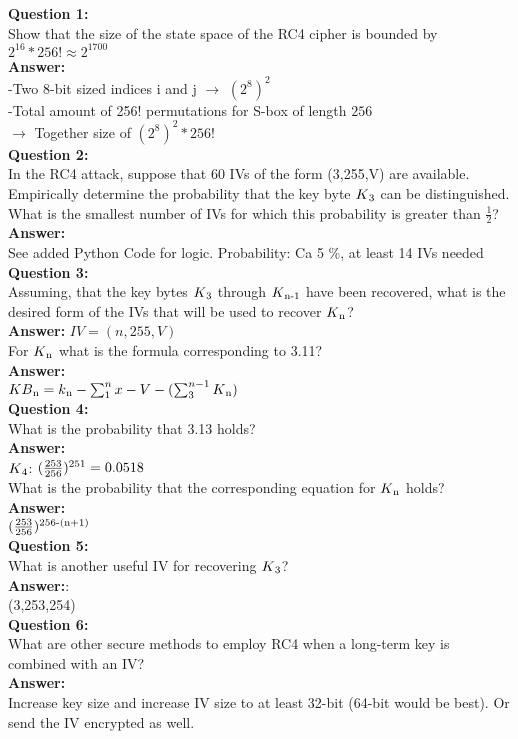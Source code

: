 \documentclass[5pt,a4paper]{article}
\begin{document}
\textbf{Question 1:}\\
Show that the size of the state space of the RC4 cipher is bounded by $2^{16} * 256! \approx 2^{1700}$\\
\textbf{Answer:} \\
-Two 8-bit sized indices i and j $\rightarrow$ $(2^{8})^{2}$\\
-Total amount of 256! permutations for S-box of length $256$\\
$\rightarrow$ Together size of $(2^{8})^{2} * 256!$\\

\textbf{Question 2:}\\
In the RC4 attack, suppose that 60 IVs of the form (3,255,V) are available. Empirically determine the probability that the key byte $K\textsubscript{3}$ can be distinguished.\\
What is the smallest number of IVs for which this probability is greater than $\frac{1}{2}$?\\
\textbf{Answer:}\\
See added Python Code for logic. Probability: Ca 5 \%, at least 14 IVs needed\\

\textbf{Question 3:}\\
Assuming, that the key bytes $K\textsubscript{3}$ through $K\textsubscript{n-1}$ have been recovered, what is the desired form of the IVs that will be used to recover $K\textsubscript{n}$?\\
\textbf{Answer:} $IV = (n,255,V)$\\
For $K\textsubscript{n}$ what is the formula corresponding to 3.11?\\
\textbf{Answer:} \\
$KB\textsubscript{n} = k\textsubscript{n} - \sum_{1}^{n}x - V - (\sum_{3}^{n-1}K\textsubscript{n})$\\

\textbf{Question 4:}\\
What is the probability that 3.13 holds?\\
\textbf{Answer:}\\
$K\textsubscript{4}$: $(\frac{253}{256})\textsuperscript{251} = 0.0518$\\
What is the probability that the corresponding equation for $K\textsubscript{n}$ holds?\\
\textbf{Answer:}\\
$(\frac{253}{256})\textsuperscript{256-(n+1)}$\\

\textbf{Question 5:}\\
What is another useful IV for recovering $K\textsubscript{3}$?\\
\textbf{Answer:}:\\
(3,253,254)\\
\textbf{Question 6:}\\
What are other secure methods to employ RC4 when a long-term key is combined with an IV?\\
\textbf{Answer:}\\
Increase key size and increase IV size to at least 32-bit (64-bit would be best). Or send the IV encrypted as well.
\end{document}
